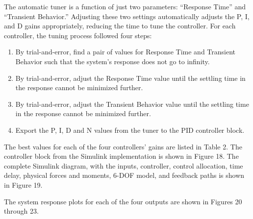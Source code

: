 The automatic tuner is a function of just two parameters: ``Response Time'' and ``Transient Behavior.'' Adjusting these two settings automatically adjusts the P, I, and D gains appropriately, reducing the time to tune the controller. For each controller, the tuning process followed four steps:
\begin{enumerate}
    \item By trial-and-error, find a pair of values for Response Time and Transient Behavior such that the system's response does not go to infinity.
    \item By trial-and-error, adjust the Response Time value until the settling time in the response cannot be minimized further.
    \item By trial-and-error, adjust the Transient Behavior value until the settling time in the response cannot be minimized further.
    \item Export the P, I, D and N values from the tuner to the PID controller block.
\end{enumerate}

The best values for each of the four controllers' gains are listed in Table 2. The controller block from the Simulink implementation is shown in Figure 18. The complete Simulink diagram, with the inputs, controller, control allocation, time delay, physical forces and moments, 6-DOF model, and feedback paths is shown in Figure 19.

The system response plots for each of the four outputs are shown in Figures 20 through 23.